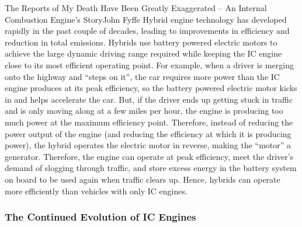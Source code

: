 \documentclass[10pt]{papertex}
\begin{document}
\begin{news}{2}{The Reports of My Death Have Been Greatly Exaggerated -- An Internal Combustion Engine’s Story}{John Fyffe}{}{}
Hybrid engine technology has developed rapidly in the past couple of decades, 
leading to improvements in efficiency and reduction in total emissions.  
Hybrids use battery powered electric motors to achieve the large dynamic 
driving range required while keeping the IC engine close to its most 
efficient operating point.  For example, when a driver is merging onto the 
highway and “steps on it”, the car requires more power than the IC engine 
produces at its peak efficiency, so the battery powered electric motor kicks 
in and helps accelerate the car.  But, if the driver ends up getting stuck 
in traffic and is only moving along at a few miles per hour, the engine is 
producing too much power at the maximum efficiency point.  Therefore, 
instead of reducing the power output of the engine (and reducing the 
efficiency at which it is producing power), the hybrid operates the electric 
motor in reverse, making the “motor” a generator.  Therefore, the engine can 
operate at peak efficiency, meet the driver’s demand of slogging through 
traffic, and store excess energy in the battery system on board to be used 
again when traffic clears up. Hence, hybrids can operate more efficiently 
than vehicles with only IC engines.

\subsubsection*{The Continued Evolution of IC Engines}


\end{news}
\end{document}
